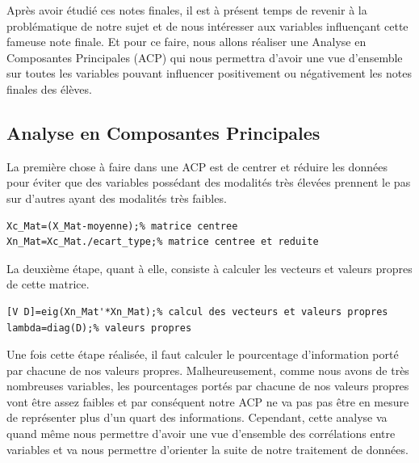 \documentclass[11pt]{article}
\begin{document}
Après avoir étudié ces notes finales, il est à présent temps de revenir à la problématique de notre sujet et de nous intéresser aux variables influençant cette fameuse note finale. Et pour ce faire, nous allons réaliser une Analyse en Composantes Principales (ACP) qui nous permettra d'avoir une vue d'ensemble sur toutes les variables pouvant influencer positivement ou négativement les notes finales des élèves.

\subsection{Analyse en Composantes Principales}
La première chose à faire dans une ACP est de centrer et réduire les données pour éviter que des variables possédant des modalités très élevées prennent le pas sur d'autres ayant des modalités très faibles. 
\begin{lstlisting}[firstnumber=62]
Xc_Mat=(X_Mat-moyenne);% matrice centree
Xn_Mat=Xc_Mat./ecart_type;% matrice centree et reduite
\end{lstlisting}

La deuxième étape, quant à elle, consiste à calculer les vecteurs et valeurs propres de cette matrice.
\begin{lstlisting}[firstnumber=65]
[V D]=eig(Xn_Mat'*Xn_Mat);% calcul des vecteurs et valeurs propres
lambda=diag(D);% valeurs propres
\end{lstlisting}

Une fois cette étape réalisée, il faut calculer le pourcentage d'information porté par chacune de nos valeurs propres. Malheureusement, comme nous avons de très nombreuses variables, les pourcentages portés par chacune de nos valeurs propres vont être assez faibles et par conséquent notre ACP ne va pas pas être en mesure de représenter plus d'un quart des informations. Cependant, cette analyse va quand même nous permettre d'avoir une vue d'ensemble des corrélations entre variables et va nous permettre d'orienter la suite de notre traitement de données.
\end{document}
